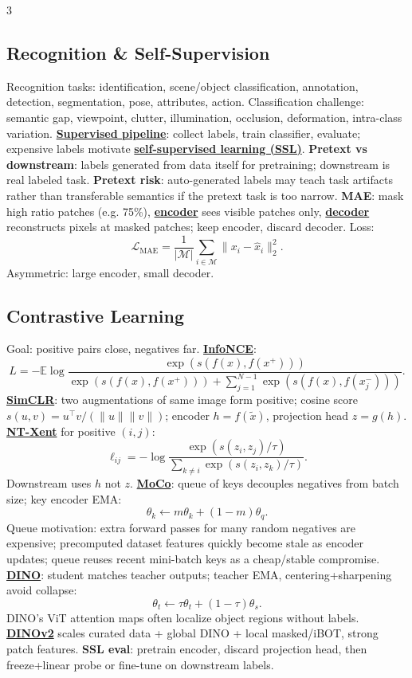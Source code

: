 \documentclass{article}
\numberwithin{equation}{subsection}
\newcommand{\key}[1]{\textbf{#1}}
\newcommand{\lowterm}[1]{\textbf{\underline{#1}}}
\newcommand{\E}{\mathbb{E}}
\begin{document}
\begin{multicols*}{3}
\subsection{Recognition \& Self-Supervision}
Recognition tasks: identification, scene/object classification, annotation, detection, segmentation, pose, attributes, action. Classification challenge: semantic gap, viewpoint, clutter, illumination, occlusion, deformation, intra-class variation. \lowterm{Supervised pipeline}: collect labels, train classifier, evaluate; expensive labels motivate \lowterm{self-supervised learning (SSL)}.
\key{Pretext vs downstream}: labels generated from data itself for pretraining; downstream is real labeled task. \key{Pretext risk}: auto-generated labels may teach task artifacts rather than transferable semantics if the pretext task is too narrow.
\key{MAE}: mask high ratio patches (e.g. 75\%), \lowterm{encoder} sees visible patches only, \lowterm{decoder} reconstructs pixels at masked patches; keep encoder, discard decoder. Loss:
\[
\mathcal L_{\mathrm{MAE}}=\frac1{|\mathcal M|}\sum_{i\in\mathcal M}\|x_i-\hat x_i\|_2^2.
\]
Asymmetric: large encoder, small decoder.

\subsection{Contrastive Learning}
Goal: positive pairs close, negatives far. \lowterm{InfoNCE}:
\[
L=-\E\log\frac{\exp(s(f(x),f(x^+)))}{\exp(s(f(x),f(x^+)))+\sum_{j=1}^{N-1}\exp(s(f(x),f(x_j^-)))}.
\]
\lowterm{SimCLR}: two augmentations of same image form positive; cosine score $s(u,v)=u^\top v/(\|u\|\|v\|)$; encoder $h=f(\tilde x)$, projection head $z=g(h)$. \lowterm{NT-Xent} for positive $(i,j)$:
\[
\ell_{ij}=-\log\frac{\exp(s(z_i,z_j)/\tau)}{\sum_{k\ne i}\exp(s(z_i,z_k)/\tau)}.
\]
Downstream uses $h$ not $z$. \lowterm{MoCo}: queue of keys decouples negatives from batch size; key encoder EMA:
\[
\theta_k\leftarrow m\theta_k+(1-m)\theta_q.
\]
Queue motivation: extra forward passes for many random negatives are expensive; precomputed dataset features quickly become stale as encoder updates; queue reuses recent mini-batch keys as a cheap/stable compromise.
\lowterm{DINO}: student matches teacher outputs; teacher EMA, centering+sharpening avoid collapse:
\[
\theta_t\leftarrow \tau\theta_t+(1-\tau)\theta_s.
\]
DINO's ViT attention maps often localize object regions without labels. \lowterm{DINOv2} scales curated data + global DINO + local masked/iBOT, strong patch features. \key{SSL eval}: pretrain encoder, discard projection head, then freeze+linear probe or fine-tune on downstream labels.


\end{multicols*}
\end{document}
